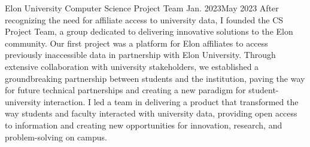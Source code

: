 \documentclass{listofpersonalprofessionalachievements}
\begin{document}
\begin{itemize}
    {Elon University Computer Science Project Team}
    {Jan. 2023}{May 2023}
    {After recognizing the need for affiliate access to university data, I founded the CS Project Team, a group dedicated to delivering innovative solutions to the Elon community. Our first project was a platform for Elon affiliates to access previously inaccessible data in partnership with Elon University. Through extensive collaboration with university stakeholders, we established a groundbreaking partnership between students and the institution, paving the way for future technical partnerships and creating a new paradigm for student-university interaction. I led a team in delivering a product that transformed the way students and faculty interacted with university data, providing open access to information and creating new opportunities for innovation, research, and problem-solving on campus.}
\end{itemize}
\end{document}
